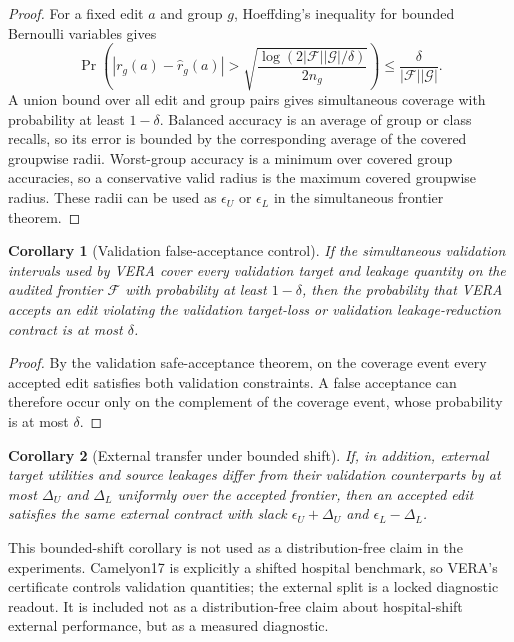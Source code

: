 \documentclass[10pt]{article}
\newtheorem{corollary}{Corollary}
\begin{document}
\begin{proof}
For a fixed edit $a$ and group $g$, Hoeffding's inequality for bounded
Bernoulli variables gives
\[
\Pr\left(|r_g(a)-\widehat r_g(a)| >
\sqrt{\frac{\log(2|\mathcal{F}||\mathcal{G}|/\delta)}{2n_g}}\right)
\le \frac{\delta}{|\mathcal{F}||\mathcal{G}|}.
\]
A union bound over all edit and group pairs gives simultaneous coverage with
probability at least $1-\delta$. Balanced accuracy is an average of group or
class recalls, so its error is bounded by the corresponding average of the
covered groupwise radii. Worst-group accuracy is a minimum over covered group
accuracies, so a conservative valid radius is the maximum covered groupwise
radius. These radii can be used as $\epsilon_U$ or $\epsilon_L$ in the
simultaneous frontier theorem.
\end{proof}

\begin{corollary}[Validation false-acceptance control]
If the simultaneous validation intervals used by VERA cover every validation
target and leakage quantity on the audited frontier $\mathcal{F}$ with
probability at least $1-\delta$, then the probability that VERA accepts an
edit violating the validation target-loss or validation leakage-reduction
contract is at most $\delta$.
\end{corollary}

\begin{proof}
By the validation safe-acceptance theorem, on the coverage event every accepted edit
satisfies both validation constraints. A false acceptance can therefore occur
only on the complement of the coverage event, whose probability is at most
$\delta$.
\end{proof}

\begin{corollary}[External transfer under bounded shift]
If, in addition, external target utilities and source leakages differ from
their validation counterparts by at most $\Delta_U$ and $\Delta_L$ uniformly
over the accepted frontier, then an accepted edit satisfies the same external
contract with slack $\epsilon_U+\Delta_U$ and $\epsilon_L-\Delta_L$.
\end{corollary}

This bounded-shift corollary is not used as a distribution-free claim in the
experiments. Camelyon17 is explicitly a shifted hospital benchmark, so VERA's
certificate controls validation quantities; the external split is a locked
diagnostic readout. It is included not as a distribution-free claim about
hospital-shift external performance, but as a measured diagnostic.
\end{document}
